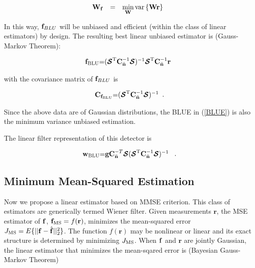 \documentclass[a4paper,11pt,fleqn]{article}
\newcommand{\br}{{\mathbf r}}
\newcommand{\bC}{{\bf C}}
\newcommand{\bg}{{\bf g}}
\newcommand{\bn}{{\bf n}}
\newcommand{\bw}{{\bf w}}
\newcommand{\bbf}{{\bf f}}
\newcommand{\bW}{{\bf W}}
\newcommand{\bcS}{{\mbox {\boldmath ${\cal S}$}}}
\begin{document}
\begin{equation}
\begin{array}{rcl}
\bW_{\bbf}&=&\min\limits_{\bW} \mbox{var}\left\{\bW\br\right\}
\end{array}
\end{equation}

In this way, ${\bbf}_{BLU}$ will be unbiased and efficient (within
the class of linear estimators) by design. The resulting best
linear unbiased estimator is (Gauss-Markov Theorem):

\begin{equation}
\begin{array}{rcl}
{\bbf}_{\rm BLU}$=$(\bcS^{\rm
T}\bC_{\bar{\bn}}^{-1}\bcS)^{-1}\bcS^{\rm
T}\bC_{\bar{\bn}}^{-1}\br
\end{array} \label{BLUE}
\end{equation}

\noindent with the covariance matrix of ${\bbf}_{BLU}$ is

\begin{equation}
\begin{array}{rcl}
{\bC}_{\bbf_{\rm BLU}}$=$(\bcS^{\rm
T}\bC_{\bar{\bn}}^{-1}\bcS)^{-1}
\end{array}.
\end{equation}

\noindent Since the above data are of Gaussian distributions, the
BLUE in (\ref{BLUE}) is also the minimum variance unbiased
estimation.

The linear filter representation of this detector is

\begin{equation}
\begin{array}{rcl}
{\bw}_{\rm BLU}$=$\bg\bC_{\bar{\bn}}^{-T}\bcS(\bcS^{\rm
T}\bC_{\bar{\bn}}^{-1}\bcS)^{-1}\
\end{array}. \label{w_BLUE}
\end{equation}



\subsection{Minimum Mean-Squared Estimation}
Now we propose a linear estimator based on MMSE criterion. This
class of estimators are generically termed Wiener filter. Given
measurements $\br$, the MSE estimator of $\bbf$, ${\bbf}_{\rm MS}
= f( \br )$, minimizes the mean-squared error $J_{\rm
MS}=E\{||\bbf-\hat{\bbf}||_2^2\}$. The function $f(\br)$ may be
nonlinear or linear and its exact structure is determined by
minimizing $J_{\rm MS}$. When $\bbf$ and $\br$ are jointly
Gaussian, the linear estimator that minimizes the mean-sqared
error is (Bayesian Gauss-Markov Theorem)
\end{document}
